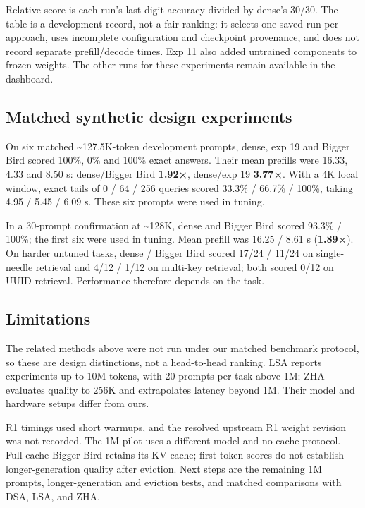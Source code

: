 \documentclass[
  10pt,
]{article}
\begin{document}
Relative score is each run's last-digit accuracy divided by dense's
30/30. The table is a development record, not a fair ranking: it selects
one saved run per approach, uses incomplete configuration and checkpoint
provenance, and does not record separate prefill/decode times. Exp 11
also added untrained components to frozen weights. The other runs for
these experiments remain available in the dashboard.

\newpage

\subsection{Matched synthetic design
experiments}\label{matched-synthetic-design-experiments}

On six matched \textasciitilde127.5K-token development prompts, dense,
exp 19 and Bigger Bird scored 100\%, 0\% and 100\% exact answers. Their
mean prefills were 16.33, 4.33 and 8.50 s: dense/Bigger Bird
\textbf{1.92×}, dense/exp 19 \textbf{3.77×}. With a 4K local window,
exact tails of 0 / 64 / 256 queries scored 33.3\% / 66.7\% / 100\%,
taking 4.95 / 5.45 / 6.09 s. These six prompts were used in tuning.

In a 30-prompt confirmation at \textasciitilde128K, dense and Bigger
Bird scored 93.3\% / 100\%; the first six were used in tuning. Mean
prefill was 16.25 / 8.61 s (\textbf{1.89×}). On harder untuned tasks,
dense / Bigger Bird scored 17/24 / 11/24 on single-needle retrieval and
4/12 / 1/12 on multi-key retrieval; both scored 0/12 on UUID retrieval.
Performance therefore depends on the task.

\subsection{Limitations}\label{limitations}

The related methods above were not run under our matched benchmark
protocol, so these are design distinctions, not a head-to-head ranking.
LSA reports experiments up to 10M tokens, with 20 prompts per task above
1M; ZHA evaluates quality to 256K and extrapolates latency beyond 1M.
Their model and hardware setups differ from ours.

R1 timings used short warmups, and the resolved upstream R1 weight
revision was not recorded. The 1M pilot uses a different model and
no-cache protocol. Full-cache Bigger Bird retains its KV cache;
first-token scores do not establish longer-generation quality after
eviction. Next steps are the remaining 1M prompts, longer-generation and
eviction tests, and matched comparisons with DSA, LSA, and ZHA.
\end{document}
